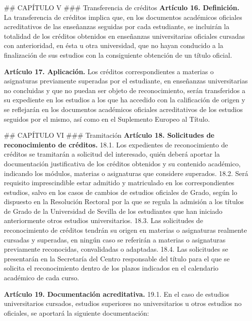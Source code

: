 \documentclass{article}
\begin{document}
\begin{itemize}
\begin{itemize}
\begin{scriptsize}
                  \#\# CAPÍTULO V
                  \#\#\# Transferencia de créditos
                  \textbf{Artículo 16. Definición.}
                  La transferencia de créditos implica que, en los documentos académicos oficiales acreditativos de las enseñanzas seguidas por cada estudiante, se incluirán la totalidad de los créditos obtenidos en enseñanzas universitarias oficiales cursadas con anterioridad, en ésta u otra universidad, que no hayan conducido a la finalización de sus estudios con la consiguiente obtención de un título oficial.

                  \textbf{Artículo 17. Aplicación.}
                  Los créditos correspondientes a materias o asignaturas previamente superadas por el estudiante, en enseñanzas universitarias no concluidas y que no puedan ser objeto de reconocimiento, serán transferidos a su expediente en los estudios a los que ha accedido con la calificación de origen y se reflejarán en los documentos académicos oficiales acreditativos de los estudios seguidos por el mismo, así como en el Suplemento Europeo al Título.

                  \#\# CAPÍTULO VI
                  \#\#\# Tramitación
                  \textbf{Artículo 18. Solicitudes de reconocimiento de créditos.}
                  18.1. Los expedientes de reconocimiento de créditos se tramitarán a solicitud del interesado, quién deberá aportar la documentación justificativa de los créditos obtenidos y su contenido académico, indicando los módulos, materias o asignaturas que considere superados.
                  18.2. Será requisito imprescindible estar admitido y matriculado en los correspondientes estudios, salvo en los casos de cambios de estudios oficiales de Grado, según lo dispuesto en la Resolución Rectoral por la que se regula la admisión a los títulos de Grado de la Universidad de Sevilla de los estudiantes que han iniciado anteriormente otros estudios universitarios.
                  18.3. Las solicitudes de reconocimiento de créditos tendrán su origen en materias o asignaturas realmente cursadas y superadas, en ningún caso se referirán a materias o asignaturas previamente reconocidas, convalidadas o adaptadas.
                  18.4. Las solicitudes se presentarán en la Secretaría del Centro responsable del título para el que se solicita el reconocimiento dentro de los plazos indicados en el calendario académico de cada curso.

                  \textbf{Artículo 19. Documentación acreditativa.}
                  19.1. En el caso de estudios universitarios cursados, estudios superiores no universitarios u otros estudios no oficiales, se aportará la siguiente documentación:


\end{scriptsize}
\end{itemize}
\end{itemize}
\end{document}
